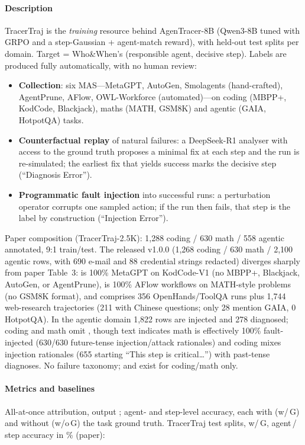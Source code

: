 \paragraph{Description} TracerTraj is the \emph{training} resource behind AgenTracer-8B (Qwen3-8B tuned with GRPO and a step-Gaussian + agent-match reward), with held-out test splits per domain. Target = Who\&When's (responsible agent, decisive step). Labels are produced fully automatically, with no human review:
\begin{itemize}
\item \textbf{Collection}: six MAS---MetaGPT, AutoGen, Smolagents (hand-crafted), AgentPrune, AFlow, OWL-Workforce (automated)---on coding (MBPP+, KodCode, Blackjack), maths (MATH, GSM8K) and agentic (GAIA, HotpotQA) tasks.
\item \textbf{Counterfactual replay} of natural failures: a DeepSeek-R1 analyser with access to the ground truth proposes a minimal fix at each step and the run is re-simulated; the earliest fix that yields success marks the decisive step (``Diagnosis Error'').
\item \textbf{Programmatic fault injection} into successful runs: a perturbation operator corrupts one sampled action; if the run then fails, that step is the label by construction (``Injection Error'').
\end{itemize}
Paper composition (TracerTraj-2.5K): 1,288 coding / 630 math / 558 agentic annotated, 9:1 train/test. The released v1.0.0 (1,268 coding / 630 math / 2,100 agentic rows, with 690 e-mail and 88 credential strings redacted) diverges sharply from paper Table~3:  is 100\% MetaGPT on KodCode-V1 (no MBPP+, Blackjack, AutoGen, or AgentPrune),  is 100\% AFlow workflows on MATH-style  problems (no GSM8K \code{\#\#\#\#} format), and  comprises 356 OpenHands/ToolQA runs plus 1,744 web-research trajectories (211 with Chinese questions; only 28 mention GAIA, 0 HotpotQA). In the agentic domain 1,822 rows are injected and 278 diagnosed; coding and math omit , though  text indicates math is effectively 100\% fault-injected (630/630 future-tense injection/attack rationales) and coding mixes injection rationales (655 starting ``This step is critical\ldots'') with past-tense diagnoses. No failure taxonomy;  and  exist for coding/math only.

\paragraph{Metrics and baselines} All-at-once attribution, output ; agent- and step-level accuracy, each with (w/\,G) and without (w/o\,G) the task ground truth. TracerTraj test splits, w/\,G, agent\,/\,step accuracy in \% (paper):


